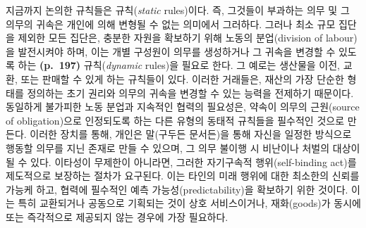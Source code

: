 지금까지 논의한 규칙들은  규칙(\emph{static} rules)이다.
즉, 그것들이 부과하는 의무 및 그 의무의 귀속은 개인에 의해 변형될 수
없는 의미에서 그러하다. 그러나 최소 규모 집단을 제외한 모든 집단은,
충분한 자원을 확보하기 위해 노동의 분업(division of labour)을 발전시켜야
하며, 이는 개별 구성원이 의무를 생성하거나 그 귀속을 변경할 수 있도록
하는 \textbf{(p.~197)}  규칙(\emph{dynamic} rules)을 필요로
한다. 그 예로는 생산물을 이전, 교환, 또는 판매할 수 있게 하는 규칙들이
있다. 이러한 거래들은, 재산의 가장 단순한 형태를 정의하는 초기 권리와
의무의 귀속을 변경할 수 있는 능력을 전제하기 때문이다. 동일하게 불가피한
노동 분업과 지속적인 협력의 필요성은, 약속이 의무의 근원(source of
obligation)으로 인정되도록 하는 다른 유형의 동태적 규칙들을 필수적인
것으로 만든다. 이러한 장치를 통해, 개인은 말(구두든 문서든)을 통해
자신을 일정한 방식으로 행동할 의무를 지닌 존재로 만들 수 있으며, 그 의무
불이행 시 비난이나 처벌의 대상이 될 수 있다. 이타성이 무제한이 아니라면,
그러한 자기구속적 행위(self-binding act)를 제도적으로 보장하는 절차가
요구된다. 이는 타인의 미래 행위에 대한 최소한의 신뢰를 가능케 하고,
협력에 필수적인 예측 가능성(predictability)을 확보하기 위한 것이다. 이는
특히 교환되거나 공동으로 기획되는 것이 상호 서비스이거나, 재화(goods)가
동시에 또는 즉각적으로 제공되지 않는 경우에 가장 필요하다.

